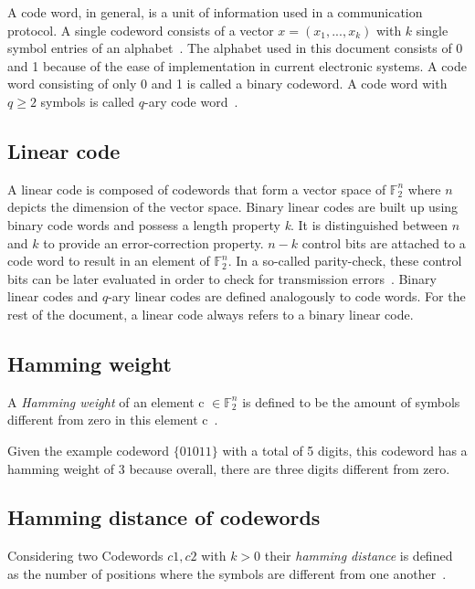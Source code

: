 \documentclass[11pt,
  oneside,openany,    %
]{scrreprt}
\begin{document}
A code word, in general, is a unit of information used in a
communication protocol. A single codeword consists of a vector $x = (x_{1},...,x_{k})$ with $k$ single symbol entries of an alphabet~\cite{mathefuerInfoBand1}. The alphabet used in this document consists of 0 and 1 because of the ease of implementation in current electronic systems. A code word consisting of only 0 and 1 is called a binary codeword. A code word with $q \geq 2$ symbols is called $q$-ary code word~\cite{jaygrossman}.

\subsection{Linear code}

A linear code is composed of codewords that form a vector space of $\mathbb{F}^{n}_{2}$ where $n$ depicts the dimension of the vector space. Binary linear codes are built up using binary code words and possess a length property \emph{k}. It is distinguished between $n$ and $k$ to provide an error-correction property. $n - k$ control bits are attached to a code word to result in an element of $\mathbb{F}^{n}_{2}$. In a so-called parity-check, these control bits can be later evaluated in order to check for transmission errors~\cite{mathefuerInfoBand1}. Binary linear codes and $q$-ary linear codes are defined analogously to code words. For the rest of the document, a linear code always refers to a binary linear code.

\subsection{Hamming weight}
A \emph{Hamming weight} of an element c $\in \mathbb{F}^{n}_{2}$ is defined to be the amount of symbols different from zero in this element c~\cite{bernsteinLange}.

Given the example codeword $\{01011\}$ with a total of 5 digits, this codeword has a hamming weight of 3 because overall, there are three digits different from zero.

\subsection{Hamming distance of codewords}

Considering two Codewords $c1, c2$ with $k > 0$ their \emph{hamming distance} is defined as the number of positions where the symbols are different from one another~\cite{bernsteinLange}.
\end{document}
